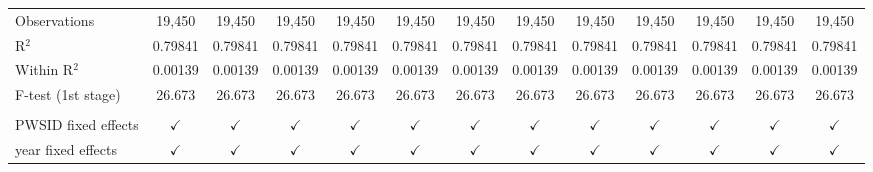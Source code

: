 \begin{table}[htbp]
\begin{adjustbox}{width = \textwidth, center}
\begin{tabular}{lcccccccccccc}
          \\
         Observations                             & 19,450                  & 19,450                 & 19,450                               & 19,450                       & 19,450                        & 19,450                       & 19,450                                     & 19,450                             & 19,450                       & 19,450                      & 19,450                                    & 19,450\\  
         R$^2$                                    & 0.79841                 & 0.79841                & 0.79841                              & 0.79841                      & 0.79841                       & 0.79841                      & 0.79841                                    & 0.79841                            & 0.79841                      & 0.79841                     & 0.79841                                   & 0.79841\\  
         Within R$^2$                             & 0.00139                 & 0.00139                & 0.00139                              & 0.00139                      & 0.00139                       & 0.00139                      & 0.00139                                    & 0.00139                            & 0.00139                      & 0.00139                     & 0.00139                                   & 0.00139\\  
         F-test (1st stage)                       & 26.673                  & 26.673                 & 26.673                               & 26.673                       & 26.673                        & 26.673                       & 26.673                                     & 26.673                             & 26.673                       & 26.673                      & 26.673                                    & 26.673\\  
          \\
         PWSID fixed effects                      & $\checkmark$            & $\checkmark$           & $\checkmark$                         & $\checkmark$                 & $\checkmark$                  & $\checkmark$                 & $\checkmark$                               & $\checkmark$                       & $\checkmark$                 & $\checkmark$                & $\checkmark$                              & $\checkmark$\\   
         year fixed effects                       & $\checkmark$            & $\checkmark$           & $\checkmark$                         & $\checkmark$                 & $\checkmark$                  & $\checkmark$                 & $\checkmark$                               & $\checkmark$                       & $\checkmark$                 & $\checkmark$                & $\checkmark$                              & $\checkmark$\\   
         \bottomrule
      \end{tabular}
   \end{adjustbox}
\end{table}


